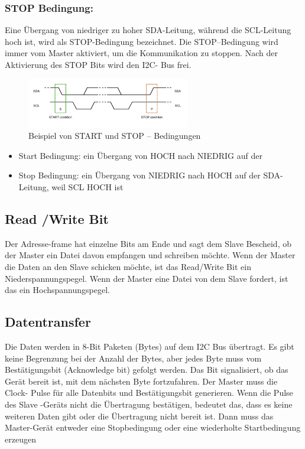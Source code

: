 \documentclass[conference]{IEEEtran}
\begin{document}
\subsubsection{STOP Bedingung: }
Eine Übergang von niedriger zu hoher SDA-Leitung, während die SCL-Leitung hoch ist, wird als STOP-Bedingung bezeichnet. Die STOP–Bedingung wird immer vom Master aktiviert, um die Kommunikation zu stoppen. Nach der Aktivierung des STOP Bits wird den I2C- Bus frei. 

\begin{figure}[h]
	\centering
	\includegraphics[width=0.7\linewidth]{fig6}
	\caption{Beispiel von START und STOP – Bedingungen}
	\label{fig:fig6}
\end{figure}

\begin{itemize}
	\item	Start Bedingung: ein Übergang von HOCH nach NIEDRIG auf der 
	\item  Stop Bedingung: ein Übergang von NIEDRIG nach HOCH auf der SDA-Leitung, weil SCL HOCH ist
\end{itemize}

\subsection{Read /Write Bit}

Der Adresse-frame hat einzelne Bits am Ende und sagt dem Slave Bescheid, ob der Master ein Datei davon empfangen und schreiben möchte. Wenn der Master die Daten an den Slave schicken möchte, ist das Read/Write Bit ein Niederspannungspegel. Wenn der Master eine Datei von dem Slave fordert, ist das ein Hochspannungspegel. 

\subsection{Datentransfer}
Die Daten werden in 8-Bit Paketen (Bytes) auf dem I2C Bus übertragt.  Es gibt keine Begrenzung bei der Anzahl der Bytes, aber jedes Byte muss vom Bestätigungsbit (Acknowledge bit) gefolgt werden. Das Bit signalisiert, ob das Gerät bereit ist, mit dem nächsten Byte fortzufahren. Der Master muss die Clock- Pulse für alle Datenbits und Bestätigungsbit generieren. Wenn die Pulse des Slave -Geräts nicht die Übertragung bestätigen, bedeutet das, dass es keine weiteren Daten gibt oder die Übertragung nicht bereit ist. Dann muss das Master-Gerät entweder eine Stopbedingung oder eine wiederholte Startbedingung erzeugen
\end{document}

